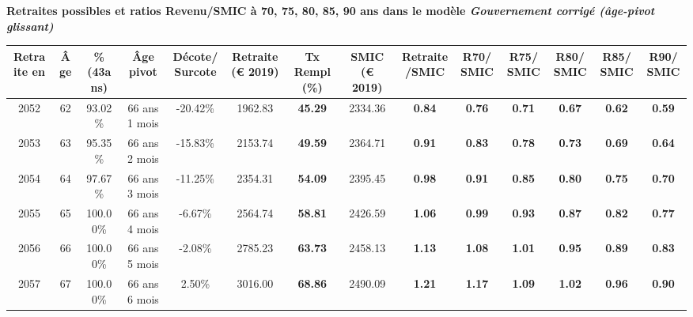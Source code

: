  \vspace{0.1cm} 
{\bf \noindent Retraites possibles et ratios Revenu/SMIC à 70, 75, 80, 85, 90 ans dans le modèle \emph{Gouvernement corrigé (âge-pivot glissant)}}  
 
\begin{adjustbox}{max width=\textwidth} 
\begin{tabular}[htb]{|c|c||c|c|c||c|c||c|c||c|c|c|c|c|} 
\hline 
 Retraite en &  Âge &  \%(43ans) &  Âge pivot &  Décote/Surcote &  Retraite (\euro{} 2019) &  Tx Rempl(\%) &  SMIC (\euro{} 2019) &  Retraite/SMIC &  R70/SMIC &  R75/SMIC &  R80/SMIC &  R85/SMIC &  R90/SMIC \\ 
\hline \hline 
 2052 &  62 &  93.02\% &  66 ans 1 mois &  -20.42\% &  1962.83 &  {\bf 45.29} &  2334.36 &  {\bf {\color{red} 0.84}} &  {\bf {\color{red} 0.76}} &  {\bf {\color{red} 0.71}} &  {\bf {\color{red} 0.67}} &  {\bf {\color{red} 0.62}} &  {\bf {\color{red} 0.59}} \\ 
\hline 
 2053 &  63 &  95.35\% &  66 ans 2 mois &  -15.83\% &  2153.74 &  {\bf 49.59} &  2364.71 &  {\bf {\color{red} 0.91}} &  {\bf {\color{red} 0.83}} &  {\bf {\color{red} 0.78}} &  {\bf {\color{red} 0.73}} &  {\bf {\color{red} 0.69}} &  {\bf {\color{red} 0.64}} \\ 
\hline 
 2054 &  64 &  97.67\% &  66 ans 3 mois &  -11.25\% &  2354.31 &  {\bf 54.09} &  2395.45 &  {\bf {\color{red} 0.98}} &  {\bf {\color{red} 0.91}} &  {\bf {\color{red} 0.85}} &  {\bf {\color{red} 0.80}} &  {\bf {\color{red} 0.75}} &  {\bf {\color{red} 0.70}} \\ 
\hline 
 2055 &  65 &  100.00\% &  66 ans 4 mois &  -6.67\% &  2564.74 &  {\bf 58.81} &  2426.59 &  {\bf 1.06} &  {\bf {\color{red} 0.99}} &  {\bf {\color{red} 0.93}} &  {\bf {\color{red} 0.87}} &  {\bf {\color{red} 0.82}} &  {\bf {\color{red} 0.77}} \\ 
\hline 
 2056 &  66 &  100.00\% &  66 ans 5 mois &  -2.08\% &  2785.23 &  {\bf 63.73} &  2458.13 &  {\bf 1.13} &  {\bf 1.08} &  {\bf 1.01} &  {\bf {\color{red} 0.95}} &  {\bf {\color{red} 0.89}} &  {\bf {\color{red} 0.83}} \\ 
\hline 
 2057 &  67 &  100.00\% &  66 ans 6 mois &  2.50\% &  3016.00 &  {\bf 68.86} &  2490.09 &  {\bf 1.21} &  {\bf 1.17} &  {\bf 1.09} &  {\bf 1.02} &  {\bf {\color{red} 0.96}} &  {\bf {\color{red} 0.90}} \\ 
\hline 
\hline 
\end{tabular} 
\end{adjustbox} 
 
